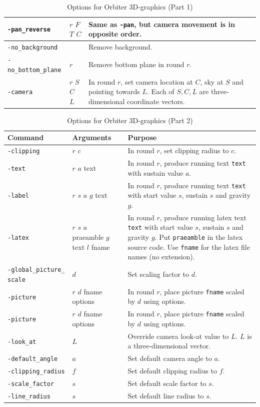 \begin{table}
\begin{center}
\begin{tabular}{|p{4cm}|p{3cm}|p{7cm}|}
\hline  
\verb'-pan_reverse' & $r$ $F$ $T$ $C$ & Same as \verb'-pan', but camera movement is in opposite order. \\
\hline  
\verb'-no_background' &  & Remove background. \\
\hline  
\verb'-no_bottom_plane' & $r$ & Remove bottom plane in round $r$. \\
\hline  
\verb'-camera' & $r$ $S$ $C$ $L$ & In round $r$, set camera location at $C$, sky at $S$ and pointing towards $L$. Each of $S,C,L$ are three-dimensional coordinate vectors. \\
\hline  
\end{tabular}
\end{center}
\caption{\label{tab:povray1}Options for Orbiter 3D-graphics (Part 1)}
\end{table}
\begin{table}
\begin{center}
\begin{tabular}{|p{4cm}|p{3cm}|p{7cm}|}
\hline
Command & Arguments & Purpose \\
\hline
\hline
\verb'-clipping' & $r$ $c$ & In round $r$, set clipping radius to $c$. \\
\hline  
\verb'-text' & $r$ $a$ text & In round $r$, produce running text \verb'text'  with sustain value $a$. \\
\hline  
\verb'-label' & $r$ $s$ $a$ $g$ text & In round $r$, produce running text \verb'text' with start value $s$, sustain $s$ and gravity $g$.  \\
\hline  
\verb'-latex' & $r$ $s$ $a$ praeamble $g$ text $l$ fname & In round $r$, produce running latex text \verb'text' with start value $s$, sustain $s$ and gravity $g$. Put \verb'praeamble' in the latex source code. Use \verb'fname' for the latex file names (no extension). \\
\hline  
\verb'-global_picture_' \verb'scale' & $d$ & Set scaling factor to $d$. \\
\hline  
\verb'-picture' & $r$ $d$ fname options & In round $r$, place picture \verb'fname' scaled by $d$ using options. \\
\hline  
\verb'-picture' & $r$ $d$ fname options & In round $r$, place picture \verb'fname' scaled by $d$ using options. \\
\hline  
\verb'-look_at' & $L$ & Override camera look-at value to $L$. $L$ is a three-dimensional vector. \\
\hline  
\verb'-default_angle' & $a$ & Set default camera angle to $a$. \\
\hline  
\verb'-clipping_radius' & $f$ & Set default clipping radius to $f$. \\
\hline  
\verb'-scale_factor' & $s$ & Set default scale factor to $s$. \\
\hline  
\verb'-line_radius' & $s$ & Set default line radius to $s$. \\
\hline  
\end{tabular}
\end{center}
\caption{\label{tab:povray2}Options for Orbiter 3D-graphics (Part 2)}
\end{table}
